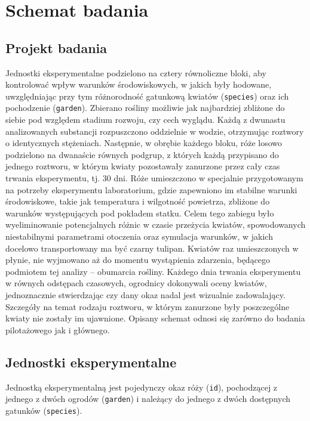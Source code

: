 \documentclass[12pt, a4paper]{article}
\begin{document}
\section{Schemat badania}

\subsection{Projekt badania}\label{experiment:scheme}
\indent Jednostki eksperymentalne podzielono na cztery równoliczne bloki, aby kontrolować wpływ warunków środowiskowych, w jakich były hodowane, uwzględniając przy tym różnorodność gatunkową kwiatów (\texttt{species}) oraz ich pochodzenie (\texttt{garden}). Zbierano rośliny możliwie jak najbardziej zbliżone do siebie pod względem stadium rozwoju, czy cech wyglądu. Każdą z dwunastu analizowanych substancji rozpuszczono oddzielnie w wodzie, otrzymując roztwory o identycznych stężeniach. Następnie, w obrębie każdego bloku, róże losowo podzielono na dwanaście równych podgrup, z których każdą przypisano do jednego roztworu, w którym kwiaty pozostawały zanurzone przez cały czas trwania eksperymentu, tj. 30 dni. Róże umieszczono w specjalnie przygotowanym na potrzeby eksperymentu laboratorium, gdzie zapewniono im stabilne warunki środowiskowe, takie jak temperatura i wilgotność powietrza, zbliżone do warunków występujących pod pokładem statku. Celem tego zabiegu było wyeliminowanie potencjalnych różnic w czasie przeżycia kwiatów, spowodowanych niestabilnymi parametrami otoczenia oraz symulacja warunków, w jakich docelowo transportowany ma być czarny tulipan. Kwiatów raz umieszczonych w płynie, nie wyjmowano aż do momentu wystąpienia zdarzenia, będącego podmiotem tej analizy -- obumarcia rośliny. Każdego dnia trwania eksperymentu w równych odstępach czasowych, ogrodnicy dokonywali oceny kwiatów, jednoznacznie stwierdzając czy dany okaz nadal jest wizualnie zadowalający. Szczegóły na temat rodzaju roztworu, w którym zanurzone były poszczególne kwiaty nie zostały im ujawnione. Opisany schemat odnosi się zarówno do badania pilotażowego jak i głównego.

\subsection{Jednostki eksperymentalne}
Jednostką eksperymentalną jest pojedynczy okaz róży (\texttt{id}), pochodzącej z jednego z dwóch ogrodów (\texttt{garden}) i należący do jednego z dwóch dostępnych gatunków (\texttt{species}).
\end{document}
